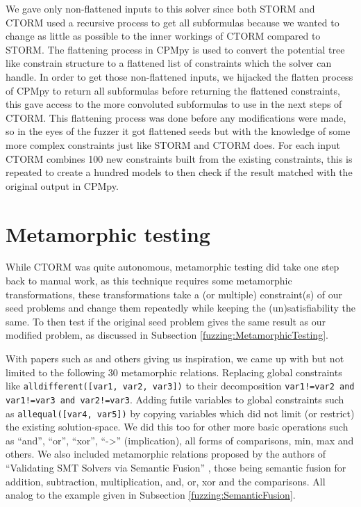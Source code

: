 We gave only non-flattened inputs to this solver since both STORM and CTORM used a recursive process to get all subformulas because we wanted to change as little as possible to the inner workings of CTORM compared to STORM. The flattening process in CPMpy is used to convert the potential tree like constrain structure to a flattened list of constraints which the solver can handle. 
In order to get those non-flattened inputs, we hijacked the flatten process of CPMpy to return all subformulas before returning the flattened constraints, this gave access to the more convoluted subformulas to use in the next steps of CTORM. This flattening process was done before any modifications were made, so in the eyes of the fuzzer it got flattened seeds but with the knowledge of some more complex constraints just like STORM and CTORM does. For each input CTORM combines 100 new constraints built from the existing constraints, this is repeated to create a hundred models to then check if the result matched with the original output in CPMpy.

%


\section{Metamorphic testing}
\label{impl:Meta}
While CTORM was quite autonomous, metamorphic testing did take one step back to manual work, as this technique requires some metamorphic transformations, these transformations take a (or multiple) constraint(s) of our seed problems and change them repeatedly while keeping the (un)satisfiability the same. To then test if the original seed problem gives the same result as our modified problem, as discussed in Subsection \ref{fuzzing:MetamorphicTesting}. 

With papers such as \cite{50akgun2018metamorphic, 49usman2020testmc, 43YinYang} and others giving us inspiration, we came up with but not limited to the following 30 metamorphic relations. Replacing global constraints like \texttt{alldifferent([var1, var2, var3])} to their decomposition \texttt{var1!=var2 and var1!=var3 and var2!=var3}. Adding futile variables to global constraints such as \texttt{allequal([var4, var5])} by copying variables which did not limit (or restrict) the existing solution-space. We did this too for other more basic operations such as “and”, “or”, “xor”, “->” (implication), all forms of comparisons, min, max and others. We also included metamorphic relations proposed by the authors of “Validating SMT Solvers via Semantic Fusion” \cite{43YinYang}, those being semantic fusion for addition, subtraction, multiplication, and, or, xor and the comparisons. All analog to the example given in Subsection \ref{fuzzing:SemanticFusion}. 

